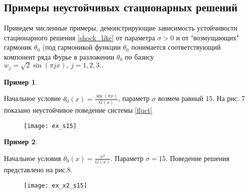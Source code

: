 \subsection{Примеры неустойчивых стационарных решений}

Приведем численные примеры, демонстрирующие зависимость устойчивости
стационарного решения \eqref{shock_like} от параметра $\sigma > 0$ и от
"возмущающих" гармоник $\theta_0$ (под гармоникой функции $\theta_0$ понимается
соответствующий компонент ряда Фурье в разложении $\theta_0$ по базису $w_j =
\sqrt{2} \sin(\pi j x), \ j = 1,2,3..$

\newtheorem{exmp_bur}{Пример}
\begin{exmp_bur}
\end{exmp_bur}

Начальное условие $\theta_0(x) = \frac{\sin(\pi x)}{G(x)}$, параметр $\sigma$ 
возмем равный 15. На рис. 7 показано неустойчивое поведение системы
\eqref{fluct}

\begin{figure}[H]
    \centering
    \texttt{[image: ex\_s15]}
    \caption{}
\end{figure}

\begin{exmp_bur}
\end{exmp_bur}
Начальное условия $\theta_0(x) = \frac{x^2}{G(x)}$. Параметр $\sigma = 15$.
Поведение решения представлено на рис.8.

\begin{figure}[H]
    \centering
    \texttt{[image: ex\_x2\_s15]}
    \caption{}
\end{figure}
